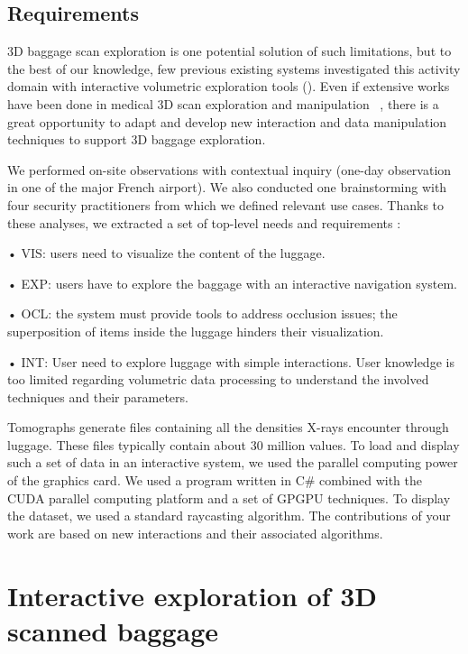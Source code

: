 \subsection{ Requirements }


3D baggage scan exploration is one potential solution of such limitations, but to the best of our knowledge, few previous existing systems investigated this activity domain with interactive volumetric exploration tools (\cite{Li:2012:LVV:2425296.2425325}). Even if extensive works have been done in medical 3D scan exploration and manipulation ~\cite{preim2013visual}, there is a great opportunity to adapt and develop new interaction and data manipulation techniques to support 3D baggage exploration.

We performed on-site observations with contextual inquiry (one-day observation in one of the major French airport). We also conducted one brainstorming with four security practitioners from which we defined relevant use cases. Thanks to these analyses, we extracted a set of top-level needs and requirements :

•	VIS: users need to visualize the content of the luggage.

•	EXP: users have to explore the baggage with an interactive navigation system.

•	OCL: the system must provide tools to address occlusion issues; the
superposition of items inside the luggage hinders their visualization.

•	INT: User need to explore luggage with simple interactions. User knowledge is too limited regarding volumetric data processing to understand the involved techniques and their parameters.


Tomographs generate files containing all the densities X-rays encounter through luggage. These files typically contain about 30 million values. To load and display such a set of data in an interactive system, we used the parallel computing power of the graphics card. We used a program written in C\# combined with the CUDA parallel computing platform and a set of GPGPU techniques. To display the dataset, we used a standard raycasting algorithm. The contributions of your work are based on new interactions and their associated algorithms.


\section{ Interactive exploration of 3D scanned baggage }

